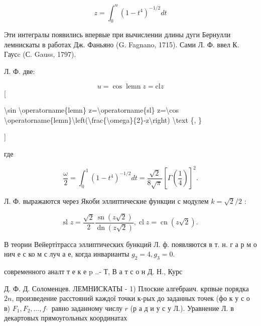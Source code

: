 \documentclass[10pt]{article}
\begin{document}
\[

z=\int_{0}^{u}\left(1-t^{4}\right)^{-1 / 2} d t

\]



Эти интегралы появились впервые при вычислении длины дуги Бернулли лемнискаты в работах Дж. Фаньяно (G. Fagnano, 1715). Сами Л. Ф. ввел К. Гаусc (С. Gauss, 1797).



Л. Ф. две:



\[

u=\cos \operatorname{lemn} z=\mathrm{cl} z

\][



\textbackslash sin \textbackslash operatorname\{lemn\} z=\textbackslash operatorname\{sl\} z=\textbackslash cos \textbackslash operatorname\{lemn\}\textbackslash left(\textbackslash frac\{\textbackslash omega\}\{2\}-z\textbackslash right) \textbackslash text \{, \}

]



где



\[

\frac{\omega}{2}=\int_{0}^{1}\left(1-t^{4}\right)^{-1 / 2} d t=\frac{\sqrt{2}}{8 \sqrt{\pi}}\left[\Gamma\left(\frac{1}{4}\right)\right]^{2} .

\]



Л. Ф. выражаются через Якоби эллиптические функции с модулем $k=\sqrt{2} / 2$ :



\[

\text { sl } z=\frac{\sqrt{2}}{2} \frac{\operatorname{sn}(z \sqrt{2})}{\operatorname{dn}(z \sqrt{2})}, \operatorname{cl} z=\operatorname{cn}(z \sqrt{2}) \text {. }

\]



В теории Вейертітрасса эллиптических бункций Л. ф. появляются в т. н. г а р м о нич е с ко м с луч а е, когда инварианты $g_{2}=4, g_{3}=0$.



современного аналт т е к е p ..- Т, В а т с о н Д. Н., Курс



Д. Ф. Д. Соломенцев. ЛЕМНИСКАТЫ - 1) Плоские алгебраич. крпвые порядка $2 n$, произведение расстояний каждої точки к-рых до заданных точек (фо к у с о в) $F_{1}, F_{2}, \ldots, f_{\text {' }}$ равно заданному числу $r$ (р а д и у с у Л.). Уравнение Л. в декартовых прямоугольных координатах
\end{document}
